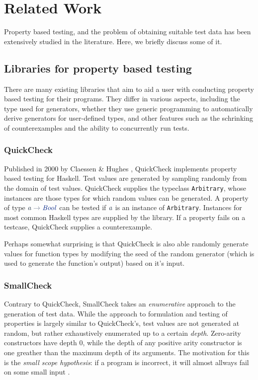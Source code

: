 \documentclass[a4paper,msc,twosized=semi]{uustthesis}
\newcommand*{\mathcolor}{}
\def\mathcolor#1#{\mathcoloraux{#1}}
\newcommand*{\mathcoloraux}[3]{%
  \protect\leavevmode
  \begingroup
    \color#1{#2}#3%
  \endgroup
}
\newcommand{\HSSym}[1]{\mathcolor{hsblue4}{#1}}
\newcommand{\HSCon}[1]{\mathcolor{hsblue3}{\mathit{#1}}}
\newcommand{\HSVar}[1]{\mathcolor{hsblue5}{\mathit{#1}}}
\begin{document}
\section{Related Work}

  Property based testing, and the problem of obtaining suitable test data has been extensively studied in the literature. Here, we briefly discuss some of it. 

\subsection{Libraries for property based testing}

  There are many existing libraries that aim to aid a user with conducting property based testing for their programs. They differ in various aspects, including the type used for generators, whether they use generic programming to automatically derive generators for user-defined types, and other features such as the schrinking of counterexamples and the ability to concurrently run tests. 

\subsubsection{QuickCheck}

  Published in 2000 by Claessen \& Hughes \cite{claessen2011quickcheck}, QuickCheck implements property based testing for Haskell. Test values are generated by sampling randomly from the domain of test values. QuickCheck supplies the typeclass \texttt{Arbitrary}, whose instances are those types for which random values can be generated. A property of type \ensuremath{\HSVar{a}\HSSym{\to} \HSCon{Bool}} can be tested if \ensuremath{\HSVar{a}} is an instance of \texttt{Arbitrary}. Instances for most common Haskell types are supplied by the library. If a property fails on a testcase, QuickCheck supplies a counterexample. 

  Perhaps somewhat surprising is that QuickCheck is also able randomly generate values for function types by modifying the seed of the random generator (which is used to generate the function's output) based on it's input. 

\subsubsection{SmallCheck} 

  Contrary to QuickCheck, SmallCheck \cite{runciman2008smallcheck} takes an \textit
  {enumerative} approach to the generation of test data. While the approach to 
  formulation and testing of properties is largely similar to QuickCheck's, test 
  values are not generated at random, but rather exhaustively enumerated up to a 
  certain \textit{depth}. Zero-arity constructors have depth $0$, while the depth of 
  any positive arity constructor is one greather than the maximum depth of its 
  arguments. The motivation for this is the \textit{small scope hypothesis}: if a 
  program is incorrect, it will almost allways fail on some small input \cite
  {andoni2003evaluating}. 
\end{document}
